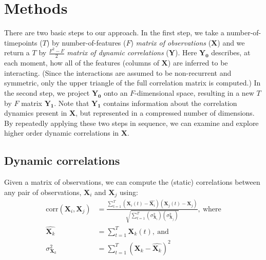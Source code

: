\documentclass[english]{article}
\begin{document}
\section*{Methods}
There are two basic steps to our approach.  In the first step, we take
a number-of-timepoints ($T$) by number-of-features ($F$)
\textit{matrix of observations} ($\mathbf{X}$) and we return a $T$ by
$\frac{F^2 - F}{2}$ \textit{matrix of dynamic correlations}
($\mathbf{Y}$).  Here $\mathbf{Y_0}$ describes, at each moment, how
all of the features (columns of $\mathbf{X}$) are inferred to be
interacting.  (Since the interactions are assumed to be non-recurrent
and symmetric, only the upper triangle of the full correlation matrix
is computed.)  In the second step, we project $\mathbf{Y_0}$ onto an
$F$-dimensional space, resulting in a new $T$ by $F$ matrix
$\mathbf{Y_1}$.  Note that $\mathbf{Y_1}$ contains information about
the correlation dynamics present in $\mathbf{X}$, but represented in a
compressed number of dimensions.  By repeatedly applying these two
steps in sequence, we can examine and explore higher order dynamic
correlations in $\mathbf{X}$.

\subsection*{Dynamic correlations}
Given a matrix of observations, we can compute the (static)
correlations between any pair of observations, $\mathbf{X}_i$ and
$\mathbf{X}_j$ using:
\begin{align}
  \mathrm{corr}(\mathbf{X}_i, \mathbf{X}_j) &= \frac{\sum_{t=1}^T \left(\mathbf{X}_i(t)
                                              -
                                              \hat{\mathbf{X}_i}\right) \left(\mathbf{X}_j(t)
                                              -
                                              \hat{\mathbf{X}_j}\right)}{\sqrt{\sum_{t=1}^T\left(
                                              \sigma^2_{\mathbf{X}_i}\right) \left(
                                              \sigma^2_{\mathbf{X}_j}\right)}},~\mathrm{where}\\
                                    \hat{\mathbf{X}_k} &= \sum_{t=1}^T
                                                         \mathbf{X}_k(t),~\mathrm{and}\\
  \sigma^2_{\mathbf{X}_k} &= \sum_{t=1}^T \left( \mathbf{X}_k -
                            \hat{\mathbf{X}_k} \right)^2 
\end{align}
\end{document}
